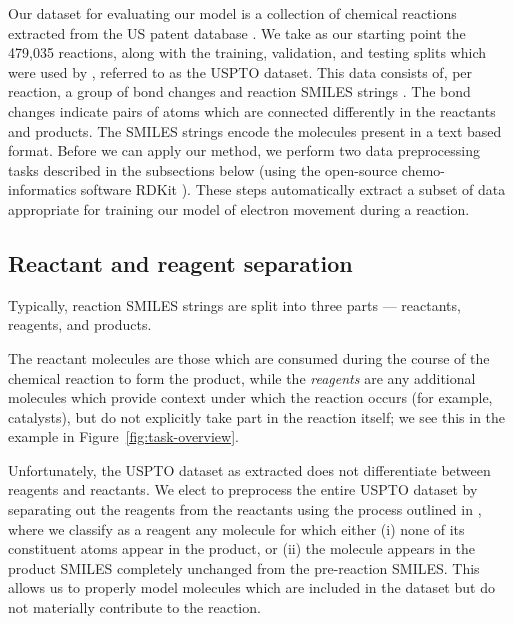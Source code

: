 

Our dataset for evaluating our model is a collection of chemical reactions extracted from the US patent database \citep{Lowe2017}.
We take as our starting point the 479,035 reactions, along with the training, validation, and testing splits 
which were used by \citet{jin2017predicting}, referred to as the USPTO dataset.
This data consists of, per reaction, a group of bond changes and reaction SMILES strings \citep{weininger1988smiles}.
The bond changes indicate pairs of atoms which are connected differently in the reactants and products.
The SMILES strings encode the molecules present in a text based format.
Before we can apply our method, we perform two data preprocessing tasks described in the subsections below
(using the open-source chemo-informatics software RDKit \citep{rdkit}).
These steps automatically
extract a subset of data appropriate for training our model of electron movement during a reaction. 


\subsection{Reactant and reagent separation}

Typically, reaction SMILES strings are split into three parts --- reactants, reagents, and products.

The reactant molecules are those which are consumed during the course of the chemical reaction to form the  product, 
while the {\em reagents} are any additional molecules which provide context under which the reaction occurs (for example, catalysts),
but do not explicitly take part in the reaction itself; we see this in the example in Figure~\ref{fig:task-overview}.

Unfortunately, the USPTO dataset as extracted does not differentiate between reagents and reactants.
We elect to preprocess the entire USPTO dataset by separating out the reagents from the reactants using the process outlined in \citet{schwaller2017found}, where we classify as a reagent any molecule for which either 
(i) none of its constituent atoms appear in the product, or 
(ii) the molecule appears in the product SMILES completely unchanged from the pre-reaction SMILES.
This allows us to properly model molecules which are included in the dataset but do not materially contribute to the reaction.

